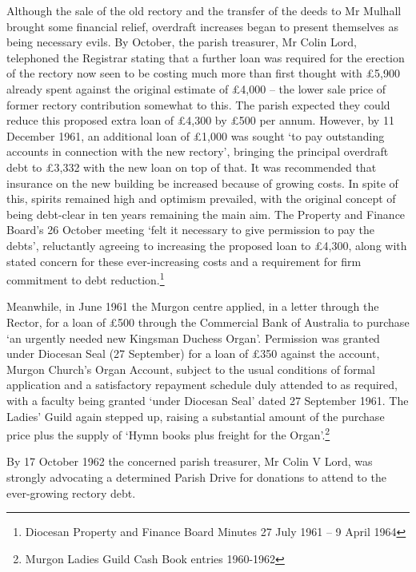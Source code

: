 Although the sale of the old rectory and the transfer of the deeds to Mr Mulhall brought some financial relief, overdraft increases began to present themselves as being necessary evils. By October, the parish treasurer, Mr Colin Lord, telephoned the Registrar stating that a further loan was required for the erection of the rectory now seen to be costing much more than first thought with \pounds5,900 already spent against the original estimate of \pounds4,000 -- the lower sale price of former rectory contribution somewhat to this. The parish expected they could reduce this proposed extra loan of \pounds4,300 by \pounds500 per annum. However, by 11 December 1961, an additional loan of \pounds1,000 was sought `to pay outstanding accounts in connection with the new rectory', bringing the principal overdraft debt to \pounds3,332 with the new loan on top of that. It was recommended that insurance on the new building be increased because of growing costs. In spite of this, spirits remained high and optimism prevailed, with the original concept of being debt-clear in ten years remaining the main aim. The Property and Finance Board's 26 October meeting `felt it necessary to give permission to pay the debts', reluctantly agreeing to increasing the proposed loan to \pounds4,300, along with stated concern for these ever-increasing costs and a requirement for firm commitment to debt reduction.\footnote{Diocesan Property and Finance Board Minutes 27 July 1961 -- 9 April 1964}


Meanwhile, in June 1961 the Murgon centre applied, in a letter through the Rector, for a loan of \pounds500 through the Commercial Bank of Australia to purchase `an urgently needed new Kingsman Duchess Organ'. Permission was granted under Diocesan Seal (27 September) for a loan of \pounds350 against the account, Murgon Church's Organ Account, subject to the usual conditions of formal application and a satisfactory repayment schedule duly attended to as required, with a faculty being granted `under Diocesan Seal' dated 27 September 1961. The Ladies' Guild again stepped up, raising a substantial amount of the purchase price plus the supply of `Hymn books plus freight for the Organ'.\footnote{Murgon Ladies Guild Cash Book entries 1960-1962}


By 17 October 1962 the concerned parish treasurer, Mr Colin V Lord, was strongly advocating a determined Parish Drive for donations to attend to the ever-growing rectory debt.









